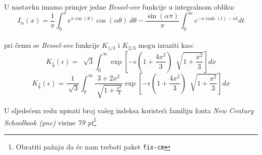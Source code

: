 \documentclass[letterpaper,10pt]{article}
\begin{document}
\noindent{}U nastavku imamo primjer jedne \textsl{Bessel-ove} funkcije u integralnom obliku:\\ \hfill{}
\begin{equation}
I_\alpha (x)=\dfrac{1}{\pi}\int_{0}^{\pi} e^{x\cos(\theta)}  \cos  {(\alpha\theta)}~d\theta - \dfrac{\sin{(\alpha\pi)}}{\pi}  \int_{0}^{\infty} e^{-x\cosh(t)-\alpha t}dt
\end{equation}\\ \hfill{}
pri čemu se \textsl{Bessel-ove} funkcije $K_{1/3}$ i $K_{2/3}$ mogu izraziti kao:\\ \hfill{}
\normalsize{\begin{equation}
K_{\frac{1}{3}} (\epsilon)=~\sqrt[]{3} \int_{0}^{\infty} \exp \left[-\epsilon\left(1+\dfrac{4x^{2}}{3}\right)~\sqrt[]{1+\dfrac{x^{2}}{3}}\right]dx
\end{equation}}\hfill{}
\normalsize{\begin{equation}
K_{\frac{2}{3}} (\epsilon) = \dfrac{1}{\sqrt[]{3}}  \int_{0}^{\infty} \dfrac{3+2x^{2}}{\sqrt[]{1+\frac{x^{2}}{3}}} \exp\left[-\epsilon \left(1+\dfrac{4x^{2}}{3}\right)~\sqrt[]{1+\dfrac{x^{2}}{3}}\right]dx
\end{equation}}
\begin{flushleft}
\noindent{}U sljedećem redu upisati broj vašeg indeksa koristeći familiju fonta \textsl{New Century Schoolbook (pnc)} visine \textit{79 pt}\footnote{
Obratiti pažnju da će nam trebati paket \texttt{fix-cm}\vspace{18.5mm}}
\end{flushleft}\vspace{1mm}
\begin{center}
\fontsize{79pt}{6.5mm}\selectfont{16116}
\end{center}
\newpage
\end{document}
